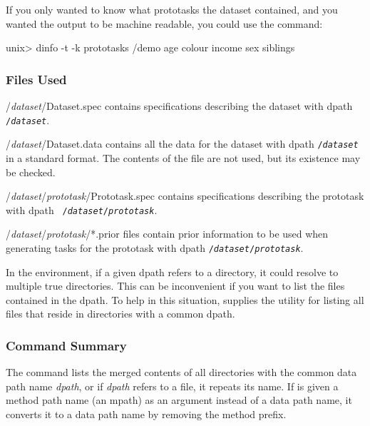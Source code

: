 If you only wanted to know what prototasks the dataset contained, and
you wanted the output to be machine readable, you could use the
command:
\begin{Session}
unix> dinfo -t -k prototasks /demo
age colour income sex siblings
\end{Session}

\subsubsection*{Files Used}
\begin{ttdescription}
\item[/{\rm\em dataset\/}/Dataset.spec]
    contains specifications describing the dataset with dpath
    \texttt{/{\rm\em dataset}}.
\item[/{\rm\em dataset\/}/Dataset.data]
    contains all the data for the dataset with dpath
    \texttt{/{\rm\em dataset}} in a \delve{} standard format.  The contents of
    the file are not used, but its existence may be checked.
\item[/{\rm\em dataset\/}/{\rm\em prototask\/}/Prototask.spec]
    contains specifications describing the prototask with dpath {\tt
    /{\rm\em dataset\/}/{\rm\em prototask}}.
\item[/{\rm\em dataset\/}/{\rm\em prototask\/}/*.prior]
    files contain prior information to be used when generating tasks for the 
    prototask with dpath \texttt{/{\rm\em dataset\/}/{\rm\em prototask}}.
\end{ttdescription}


%
%


In the \delve{} environment, if a given dpath refers to a directory,
it could resolve to multiple true directories.  This can be
inconvenient if you want to list the files contained in the dpath.  To
help in this situation, \delve{} supplies the \dls{} utility for
listing all files that reside in directories with a common dpath.

\subsubsection*{Command Summary}

The \dls{} command lists the merged contents of all directories with
the common data path name \textit{dpath}, or if \textit{dpath} refers
to a file, it repeats its name.  If \dls{} is given a method path name
(an mpath) as an argument instead of a data path name, it converts it
to a data path name by removing the method prefix.

